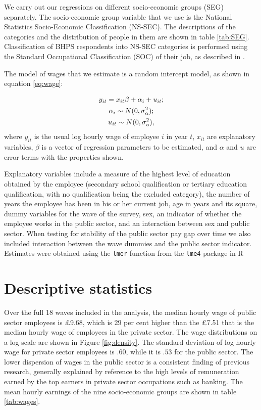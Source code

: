 \documentclass[a4paper,11pt,titlepage]{article}
\begin{document}
We carry out our regressions on different socio-economic groups (SEG) separately. The socio-economic group variable that we use is the National Statistics Socio-Economic Classification (NS-SEC). The descriptions of the categories and the distribution of people in them are shown in table \ref{tab:SEG}.  Classification of BHPS respondents into NS-SEC categories is performed using the Standard Occupational Classification (SOC) of their job, as described in \citet{Taylor2010}.

The model of wages that we estimate is a random intercept model, as shown in equation \eqref{eq:wage}:

\begin{gather}
y_{it} = x_{it} \beta + \alpha_i + u_{it}; \notag\\
\alpha_i \sim N(0,\sigma_\alpha^2); \label{eq:wage}\\
u_{it} \sim N(0,\sigma_u^2),\notag
\end{gather}
where $y_{it}$ is the usual log hourly wage of employee $i$ in year $t$, $x_{it}$ are explanatory variables, $\beta$ is a vector of regression parameters to be estimated, and $\alpha$ and $u$ are error terms with the properties shown.

Explanatory variables include a measure of the highest level of education obtained by the employee (secondary school qualification or tertiary education qualification, with no qualification being the excluded category), the number of years the employee has been in his or her current job, age in years and its square, dummy variables for the wave of the survey, sex, an indicator of whether the employee works in the public sector, and an interaction between sex and public sector.  When testing for stability of the public sector pay gap over time we also included interaction between the wave dummies and the public sector indicator.  Estimates were obtained using the \texttt{lmer} function from the \texttt{lme4} package in R \citep{R2011,lme2011}

\section{Descriptive statistics}
Over the full 18 waves included in the analysis, the median hourly wage of public sector employees is \pounds 9.68, which is 29 per cent higher than the \pounds 7.51 that is the median hourly wage of employees in the private sector.  The wage distributions on a log scale are shown in Figure \ref{fig:density}.  The standard deviation of log hourly wage for private sector employees is $.60$, while it is $.53$ for the public sector.  The lower dispersion of wages in the public sector is a consistent finding of previous research, generally explained by reference to the high levels of remuneration earned by the top earners in private sector occupations such as banking.  The mean hourly earnings of the nine socio-economic groups are shown in table \ref{tab:wages}.
\end{document}
